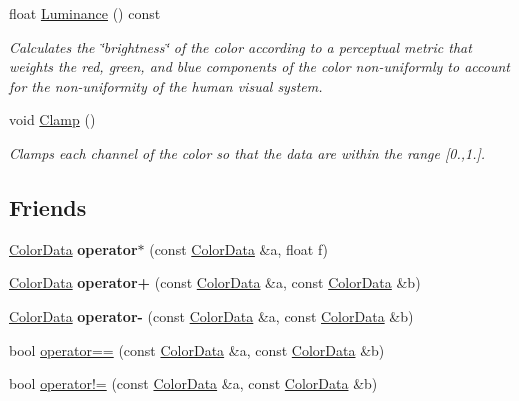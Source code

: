 \begin{DoxyCompactItemize}
float \hyperlink{classimage__tools_1_1ColorData_ac36f32461a63c77c0fdf99296e1d1faf}{Luminance} () const
\begin{DoxyCompactList}\small\item\em Calculates the \char`\"{}brightness\char`\"{} of the color according to a perceptual metric that weights the red, green, and blue components of the color non-\/uniformly to account for the non-\/uniformity of the human visual system. \end{DoxyCompactList}\item 
\mbox{\label{classimage__tools_1_1ColorData_ae64129037eb8de589e8de9dbc45704a8}} 
void \hyperlink{classimage__tools_1_1ColorData_ae64129037eb8de589e8de9dbc45704a8}{Clamp} ()
\begin{DoxyCompactList}\small\item\em Clamps each channel of the color so that the data are within the range \mbox{[}0.,1.\mbox{]}. \end{DoxyCompactList}\end{DoxyCompactItemize}
\subsection*{Friends}
\begin{DoxyCompactItemize}
\item 
\mbox{\label{classimage__tools_1_1ColorData_adf9a770243996e50282d248a4327f351}} 
\hyperlink{classimage__tools_1_1ColorData}{Color\+Data} {\bfseries operator$\ast$} (const \hyperlink{classimage__tools_1_1ColorData}{Color\+Data} \&a, float f)
\item 
\mbox{\label{classimage__tools_1_1ColorData_afee00faf26189979b72f3854a17200ae}} 
\hyperlink{classimage__tools_1_1ColorData}{Color\+Data} {\bfseries operator+} (const \hyperlink{classimage__tools_1_1ColorData}{Color\+Data} \&a, const \hyperlink{classimage__tools_1_1ColorData}{Color\+Data} \&b)
\item 
\mbox{\label{classimage__tools_1_1ColorData_a799bd54f65a61569b5b968062ac0d37e}} 
\hyperlink{classimage__tools_1_1ColorData}{Color\+Data} {\bfseries operator-\/} (const \hyperlink{classimage__tools_1_1ColorData}{Color\+Data} \&a, const \hyperlink{classimage__tools_1_1ColorData}{Color\+Data} \&b)
\item 
bool \hyperlink{classimage__tools_1_1ColorData_a9dae9e77610393d100312c9d248f09cc}{operator==} (const \hyperlink{classimage__tools_1_1ColorData}{Color\+Data} \&a, const \hyperlink{classimage__tools_1_1ColorData}{Color\+Data} \&b)
\item 
bool \hyperlink{classimage__tools_1_1ColorData_a698ac263a286afe37e3b9ed0c5882c8c}{operator!=} (const \hyperlink{classimage__tools_1_1ColorData}{Color\+Data} \&a, const \hyperlink{classimage__tools_1_1ColorData}{Color\+Data} \&b)
\end{DoxyCompactItemize}


